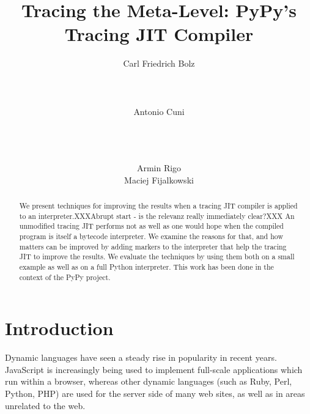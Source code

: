 \documentclass{sig-alternate}
\begin{document}
\title{Tracing the Meta-Level: PyPy's Tracing JIT Compiler}

\author{
\alignauthor Carl Friedrich Bolz\\
       \\
       \\
       \\
\alignauthor Antonio Cuni\\
       \\
       \\
       \\
\and
\alignauthor Armin Rigo\\
\alignauthor Maciej Fijalkowski\\
}
\maketitle



\begin{abstract}
We present techniques for improving the results when a tracing JIT compiler is
applied to an interpreter.XXXAbrupt start - is the relevanz really immediately clear?XXX An unmodified tracing JIT performs not as well as one
would hope when the compiled program is itself a bytecode interpreter. We
examine the reasons for that, and how matters can be improved by adding markers to
the interpreter that help the tracing JIT to improve the results. We evaluate
the techniques by using them both on a small example as well as on a full Python
interpreter. This work has been done in the context of the PyPy project.

\end{abstract}


\section{Introduction}

Dynamic languages have seen a steady rise in popularity in recent years.
JavaScript is increasingly being used to implement full-scale applications
which run within a browser, whereas other dynamic languages (such as Ruby, Perl, Python,
PHP) are used for the server side of many web sites, as well as in areas
unrelated to the web.
\end{document}
